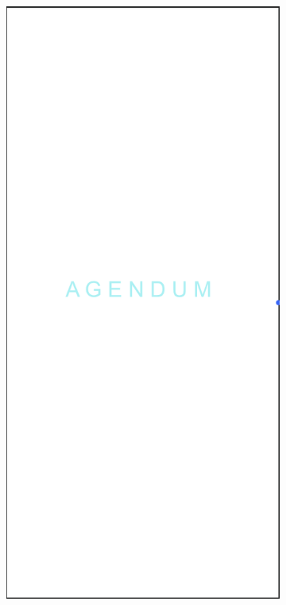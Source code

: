\begin{figure}[H]
    \centering
    \begin{subfigure}[b]{0.3\textwidth}
        \centering
        \includegraphics[width=\textwidth]{./graphics/design/Start Up Colour.png}

\end{subfigure}
\end{figure}
